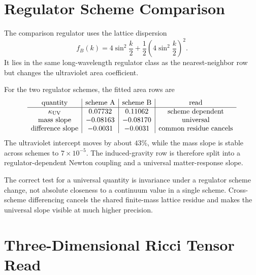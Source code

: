 \section{Regulator Scheme Comparison}
\label{sec:innovation-input-thermo-verification-regulator-comparison}

\begin{definition}
\label{def:innovation-input-thermo-second-lattice-dispersion}
The comparison regulator uses the lattice dispersion
$$
f_B(k)
=
4\sin^2\frac{k}{2}
+
\frac12
\left(4\sin^2\frac{k}{2}\right)^2.
$$
It lies in the same long-wavelength regulator class as the nearest-neighbor
row but changes the ultraviolet area coefficient.
\end{definition}

\begin{principle}
\label{prin:innovation-input-thermo-area-coefficient-scheme-test}
For the two regulator schemes, the fitted area rows are
$$
\begin{array}{c|c|c|c}
\text{quantity} & \text{scheme A} & \text{scheme B} & \text{read}\\
\hline
\kappa_{\rm UV} & 0.07732 & 0.11062 & \text{scheme dependent}\\
\text{mass slope} & -0.08163 & -0.08170 & \text{universal}\\
\text{difference slope} & -0.0031 & -0.0031
& \text{common residue cancels}
\end{array}
$$
The ultraviolet intercept moves by about $43\%$, while the mass slope is
stable across schemes to $7\times10^{-5}$. The induced-gravity row is
therefore split into a regulator-dependent Newton coupling and a universal
matter-response slope.
\end{principle}

\begin{principle}
\label{prin:innovation-input-thermo-cross-scheme-invariance-test}
The correct test for a universal quantity is invariance under a regulator
scheme change, not absolute closeness to a continuum value in a single
scheme. Cross-scheme differencing cancels the shared finite-mass lattice
residue and makes the universal slope visible at much higher precision.
\end{principle}

\section{Three-Dimensional Ricci Tensor Read}
\label{sec:innovation-input-thermo-verification-three-dimensional-ricci}

